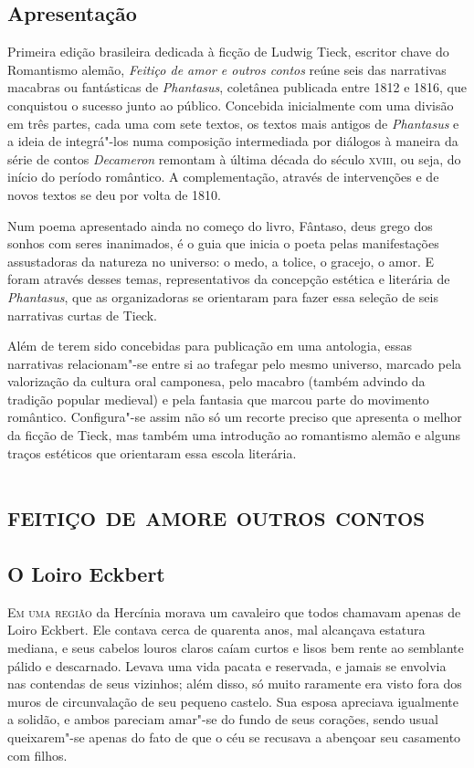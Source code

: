 \chapter{Apresentação}


Primeira edição brasileira dedicada à ficção de Ludwig Tieck, escritor chave do Romantismo alemão, \textit{Feitiço de amor e outros contos} reúne seis das narrativas macabras ou fantásticas de  \textit{Phantasus}, coletânea publicada entre 1812 e 1816, que conquistou o sucesso junto ao público.
Concebida inicialmente com uma divisão em três partes, 
cada uma com sete textos, os textos mais antigos de \textit{Phantasus} e a ideia de integrá"-los numa composição intermediada por diálogos à maneira da série de contos 
\textit{Decameron} remontam à última década do século \textsc{xviii}, 
ou seja, do início do período romântico. A complementação, 
através de intervenções e de novos textos se deu por volta 
de 1810. 

Num poema apresentado ainda no começo do livro, Fântaso, 
deus grego dos sonhos com seres inanimados, é o guia que inicia o 
poeta pelas manifestações assustadoras da natureza no universo: 
o medo, a tolice, o gracejo, o amor. 
E foram através desses temas, representativos da concepção estética e literária de \textit{Phantasus}, que as organizadoras se orientaram para fazer essa seleção de seis narrativas curtas de Tieck.

Além de terem sido concebidas para publicação em uma antologia, essas narrativas relacionam"-se entre si ao trafegar pelo mesmo universo, marcado pela valorização da cultura oral camponesa, pelo macabro (também advindo da tradição popular medieval) e pela fantasia que marcou parte do movimento romântico.
Configura"-se assim não só um recorte preciso que apresenta o melhor da ficção de Tieck, mas também uma introdução ao romantismo alemão e alguns traços estéticos que orientaram essa escola literária.

\part[feitiço de amor e outros contos]{\textsc{feitiço de amor\break e outros contos} }


\chapter{O Loiro Eckbert}


\textsc{Em uma região} da Hercínia morava um cavaleiro que todos chamavam apenas
de Loiro Eckbert. Ele contava cerca de quarenta anos, mal alcançava
estatura mediana, e seus cabelos louros claros caíam curtos e lisos bem
rente ao semblante pálido e descarnado. Levava uma vida pacata e
reservada, e jamais se envolvia nas contendas de seus vizinhos; além
disso, só muito raramente era visto fora dos muros de circunvalação de
seu pequeno castelo. Sua esposa apreciava igualmente a solidão, e ambos
pareciam amar"-se do fundo de seus corações, sendo usual queixarem"-se
apenas do fato de que o céu se recusava a abençoar seu casamento com filhos.

